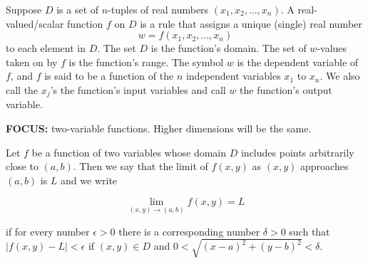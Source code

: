 \documentclass[aspectratio=169,handout]{beamer}
\begin{document}
\begin{frame}
    \begin{definition}
    Suppose $D$ is a set of $n$-tuples of real numbers $(x_1, x_2, \ldots, x_n)$. 
    A real-valued/scalar function $f$ on $D$ is a rule that assigns a unique (single) real 
    number 
    $$w = f(x_1, x_2, \ldots, x_n)$$ 
    to each element in $D$. 
    The set $D$ is the function's domain. The set of $w$-values taken on by $f$ is 
    the function's range. The symbol $w$ is the dependent variable of $f$, and $f$ 
    is said to be a function of the $n$ independent variables $x_1$ to $x_n$. 
    We also call the $x_j$'s the function's input variables and call $w$ the function's output variable.
    \end{definition}

    \pause

    \textbf{FOCUS:} two-variable functions. Higher dimensions will be the same.
\end{frame}

\begin{frame}
    \begin{definition}
Let $f$ be a function of two variables whose domain $D$ includes points arbitrarily close to $(a,b)$. Then we say that the limit of $f(x,y)$ as $(x,y)$ approaches $(a,b)$ is $L$ and we write

$$\lim_{(x,y)\to(a,b)} f(x,y) = L$$

if for every number $\epsilon > 0$ there is a corresponding number $\delta > 0$ such that
$|f(x,y) - L| < \epsilon$
if $(x,y) \in D$ and $0 < \sqrt{(x-a)^2 + (y-b)^2} < \delta$.
    \end{definition}
\end{frame}
\end{document}
